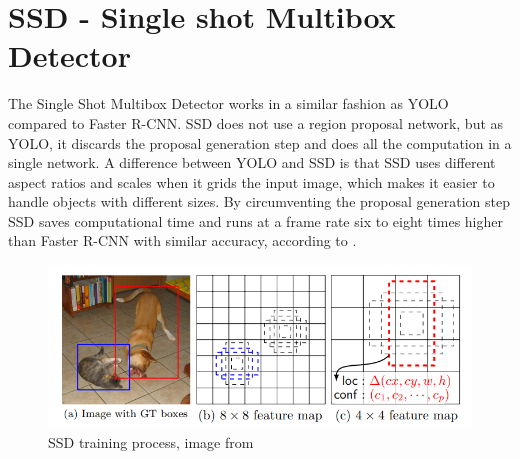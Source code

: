 

\newpage

\section{SSD - Single shot Multibox Detector}
The Single Shot Multibox Detector works in a similar fashion as YOLO compared to Faster R-CNN. SSD does not use a region proposal network, but as YOLO, it discards the proposal generation step and does all the computation in a single network. A difference between YOLO and SSD is that SSD uses different aspect ratios and scales when it grids the input image, which makes it easier to handle objects with different sizes. By circumventing the proposal generation step SSD saves computational time and runs at a frame rate six to eight times higher than Faster R-CNN with similar accuracy, according to \citep{SSD}. 

\begin{figure}[h!]
    \centering
    \includegraphics[scale=0.5]{images/ssd_detection.png}
    \caption{SSD training process, image from \citep{SSD}}
    \label{fig:ssd_training}
\end{figure}

